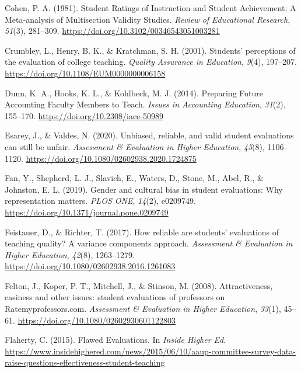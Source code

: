 \documentclass[
  man]{apa7}
\newlength{\cslhangindent}
\newlength{\cslentryspacingunit} %
\newenvironment{CSLReferences}[2] %
 {%
  \setlength{\parindent}{0pt}
  \ifodd #1
  \let\oldpar\par
  \def\par{\hangindent=\cslhangindent\oldpar}
  \fi
  \setlength{\parskip}{#2\cslentryspacingunit}
 }%
 {}
\begin{document}
\begin{CSLReferences}{1}{0}
\leavevmode{}%
Cohen, P. A. (1981). Student Ratings of Instruction and Student Achievement: A Meta-analysis of Multisection Validity Studies. \emph{Review of Educational Research}, \emph{51}(3), 281--309. \url{https://doi.org/10.3102/00346543051003281}

\leavevmode{}%
Crumbley, L., Henry, B. K., \& Kratchman, S. H. (2001). Students{'} perceptions of the evaluation of college teaching. \emph{Quality Assurance in Education}, \emph{9}(4), 197--207. \url{https://doi.org/10.1108/EUM0000000006158}

\leavevmode{}%
Dunn, K. A., Hooks, K. L., \& Kohlbeck, M. J. (2014). Preparing Future Accounting Faculty Members to Teach. \emph{Issues in Accounting Education}, \emph{31}(2), 155--170. \url{https://doi.org/10.2308/iace-50989}

\leavevmode{}%
Esarey, J., \& Valdes, N. (2020). Unbiased, reliable, and valid student evaluations can still be unfair. \emph{Assessment \& Evaluation in Higher Education}, \emph{45}(8), 1106--1120. \url{https://doi.org/10.1080/02602938.2020.1724875}

\leavevmode{}%
Fan, Y., Shepherd, L. J., Slavich, E., Waters, D., Stone, M., Abel, R., \& Johnston, E. L. (2019). Gender and cultural bias in student evaluations: Why representation matters. \emph{PLOS ONE}, \emph{14}(2), e0209749. \url{https://doi.org/10.1371/journal.pone.0209749}

\leavevmode{}%
Feistauer, D., \& Richter, T. (2017). How reliable are students{'} evaluations of teaching quality? A variance components approach. \emph{Assessment \& Evaluation in Higher Education}, \emph{42}(8), 1263--1279. \url{https://doi.org/10.1080/02602938.2016.1261083}

\leavevmode{}%
Felton, J., Koper, P. T., Mitchell, J., \& Stinson, M. (2008). Attractiveness, easiness and other issues: student evaluations of professors on Ratemyprofessors.com. \emph{Assessment \& Evaluation in Higher Education}, \emph{33}(1), 45--61. \url{https://doi.org/10.1080/02602930601122803}

\leavevmode{}%
Flaherty, C. (2015). Flawed {Evaluations}. In \emph{Inside Higher Ed}. \url{https://www.insidehighered.com/news/2015/06/10/aaup-committee-survey-data-raise-questions-effectiveness-student-teaching}


\end{CSLReferences}
\end{document}
